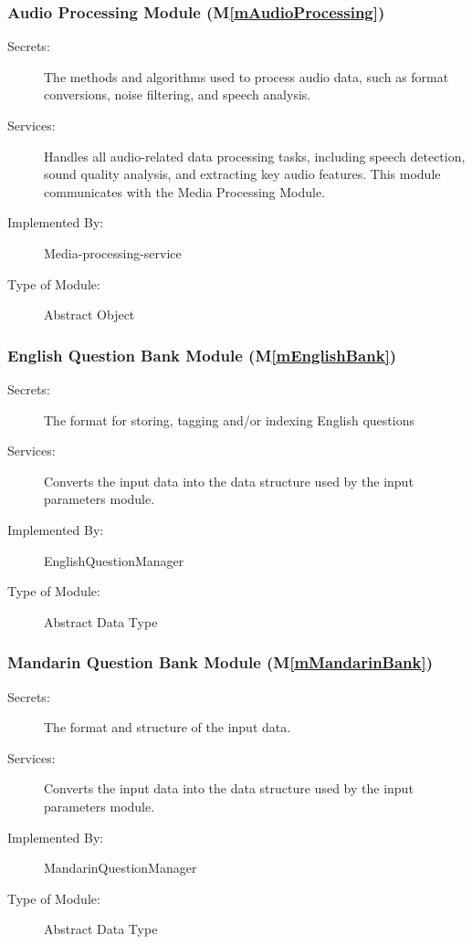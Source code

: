 \documentclass[12pt, titlepage]{article}
\newcommand{\mref}[1]{M\ref{#1}}
\begin{document}
\subsubsection{Audio Processing Module (\mref{mAudioProcessing})}
\begin{description}
\item[Secrets:] The methods and algorithms used to process audio data, such as format conversions, noise filtering, and speech analysis.
\item[Services:] Handles all audio-related data processing tasks, including speech detection, sound quality analysis, and extracting key audio features. This module communicates with the Media Processing Module.
\item[Implemented By:] Media-processing-service
\item[Type of Module:] Abstract Object
\end{description}

\subsubsection{English Question Bank Module (\mref{mEnglishBank})}

\begin{description}
\item[Secrets:]The format for storing, tagging and/or indexing English questions
\item[Services:]Converts the input data into the data structure used by the
  input parameters module.
\item[Implemented By:] EnglishQuestionManager
\item[Type of Module:] Abstract Data Type
\end{description}

\subsubsection{Mandarin Question Bank Module (\mref{mMandarinBank})}

\begin{description}
\item[Secrets:]The format and structure of the input data.
\item[Services:]Converts the input data into the data structure used by the
  input parameters module.
\item[Implemented By:] MandarinQuestionManager
\item[Type of Module:] Abstract Data Type
\end{description}
\end{document}
